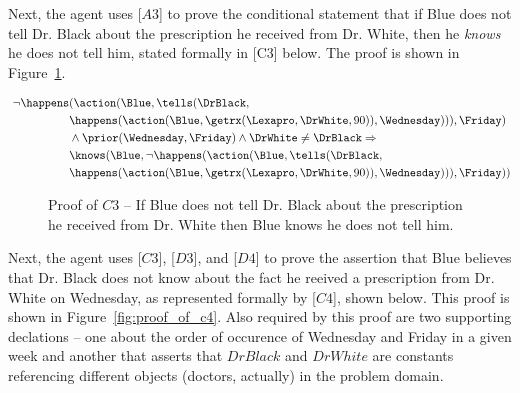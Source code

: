 \noindent Next, the agent uses [$A3$] to prove the conditional statement that if Blue does not tell Dr. Black about the prescription he received from Dr. White, then he \emph{knows} he does not tell him, stated formally in [C3] below.  The proof is shown in Figure~\ref{fig:proof_of_c3}.

\begin{footnotesize}
\begin{align*}
[C3] \ \neg \happens&(\action(\Blue,\tells(\DrBlack,\\
& \happens(\action(\Blue,\getrx(\Lexapro,\DrWhite,90)),\Wednesday))),\Friday) \\
& \wedge \prior(\Wednesday,\Friday) \wedge \DrWhite \neq \DrBlack \Rightarrow \\
& \knows(\Blue, \neg \happens(\action(\Blue,\tells(\DrBlack,\\ 
& \happens(\action(\Blue,\getrx(\Lexapro,\DrWhite,90)),\Wednesday))),\Friday))
\end{align*}
\end{footnotesize}

\begin{figure}[h!] 
\vspace{6pt}
\centering
{}
\caption{Proof of $C3$ -- If Blue does not tell Dr. Black about the prescription he received from Dr. White then Blue knows he does not tell him.}
\label{fig:proof_of_c3}
\end{figure}



\noindent Next, the agent uses [$C3$], [$D3$], and [$D4$] to prove the assertion that Blue believes that Dr. Black does not know about the fact he reeived a prescription from Dr. White on Wednesday, as represented formally by [$C4$], shown below.  This proof is shown in Figure~\ref{fig:proof_of_c4}.  Also required by this proof are two supporting declations -- one about the order of occurence of Wednesday and Friday in a given week and another that asserts that $DrBlack$ and $DrWhite$ are constants referencing different objects (doctors, actually) in the problem domain.

